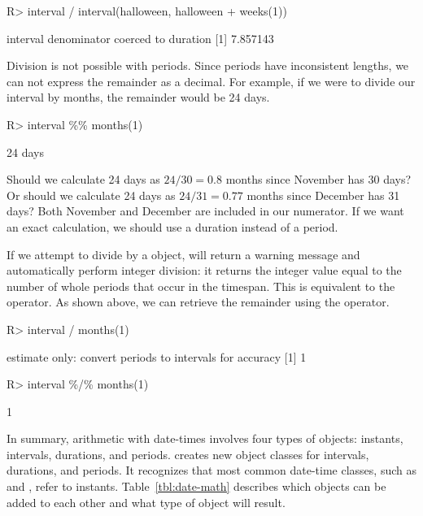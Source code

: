 \documentclass[article]{jss}
\begin{document}
\begin{CodeInput}
R> interval / interval(halloween, halloween + weeks(1))
\end{CodeInput}
\begin{CodeOutput}
interval denominator coerced to duration
[1] 7.857143
\end{CodeOutput}


Division is not possible with periods. Since periods have inconsistent lengths, we can not express the remainder as a decimal. For example, if we were to divide our interval by months, the remainder would be 24 days.

\begin{CodeInput}
R> interval \%\% months(1)
\end{CodeInput}
\begin{CodeOutput}
[1] 24 days
\end{CodeOutput}

Should we calculate 24 days as $24 / 30 = 0.8$ months since November has 30 days? Or should we calculate 24 days as $24 / 31 = 0.77$ months since December has 31 days? Both November and December are included in our numerator. If we want an exact calculation, we should use a duration instead of a period. 

If we attempt to divide by a  object,  will return a warning message and automatically perform integer division: it returns the integer value equal to the number of whole periods that occur in the timespan. This is equivalent to the \code{\%/\%} operator. As shown above, we can retrieve the remainder using the \code{\%\%} operator.

\begin{CodeInput}
R> interval / months(1)
\end{CodeInput}
\begin{CodeOutput}
estimate only: convert periods to intervals for accuracy
[1] 1
\end{CodeOutput}

\begin{CodeInput}
R> interval \%/\% months(1)
\end{CodeInput}
\begin{CodeOutput}
[1] 1
\end{CodeOutput}

In summary, arithmetic with date-times involves four types of objects: instants, intervals, durations, and periods.  creates new object classes for intervals, durations, and periods. It recognizes that most common date-time classes, such as  and , refer to instants. Table~\ref{tbl:date-math} describes which objects can be added to each other and what type of object will result.
\end{document}
